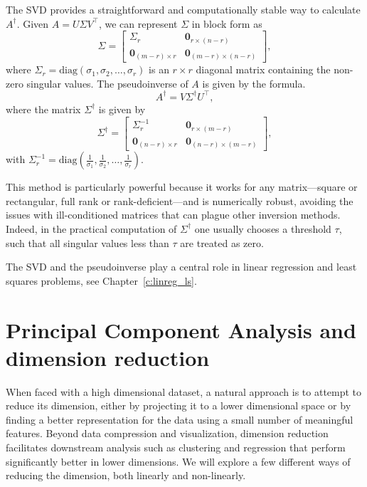 The SVD provides a straightforward and computationally stable way to calculate $A^\dagger$. 
Given $A = U \Sigma V^\top  $, we can represent $\Sigma$ in block form as
$$\Sigma = 
\begin{bmatrix} \Sigma_r & \mathbf{0}_{r \times (n-r)} \\ \mathbf{0}_{(m-r) \times r} & \mathbf{0}_{(m-r) \times (n-r)} 
\end{bmatrix},
$$
where $\Sigma_r = \text{diag}(\sigma_1, \sigma_2, \dots, \sigma_r)$ is an $r \times r$ diagonal matrix containing the non-zero singular values. The pseudoinverse of $A$ is given by the formula. 
\begin{equation}\label{pinv}
A^\dagger = V \Sigma^\dagger U^\top  ,
\end{equation}
where the matrix $\Sigma^\dagger$ is given by
$$\Sigma^\dagger = 
\begin{bmatrix} \Sigma_r^{-1} & \mathbf{0}_{r \times (m-r)} \\ \mathbf{0}_{(n-r) \times r} & \mathbf{0}_{(n-r) \times (m-r)} 
\end{bmatrix},
$$
with $\Sigma_r^{-1} = \text{diag}\left(\frac{1}{\sigma_1}, \frac{1}{\sigma_2}, \dots, \frac{1}{\sigma_r}\right)$.

This method is particularly powerful because it works for any matrix---square or rectangular, full rank or rank-deficient---and is numerically robust, avoiding the issues with ill-conditioned matrices that can plague other inversion methods. Indeed, in the practical computation of $\Sigma^\dagger$ one usually chooses a threshold $\tau$, such that all singular values less than $\tau$ are treated as zero. 

The SVD and the pseudoinverse  play a central role in linear regression and least squares problems, see Chapter~\ref{c:linreg_ls}.





\section{Principal Component Analysis and dimension reduction}\label{s:PCA}

When faced with a high dimensional dataset, a natural approach is to attempt to reduce its dimension, either by projecting it to a lower dimensional space or by finding a better representation for the data using a small number of meaningful features. Beyond data compression and visualization, dimension reduction facilitates downstream analysis such as clustering and regression that perform significantly better in lower dimensions. We will explore a few different ways of reducing the dimension, both linearly and non-linearly.

